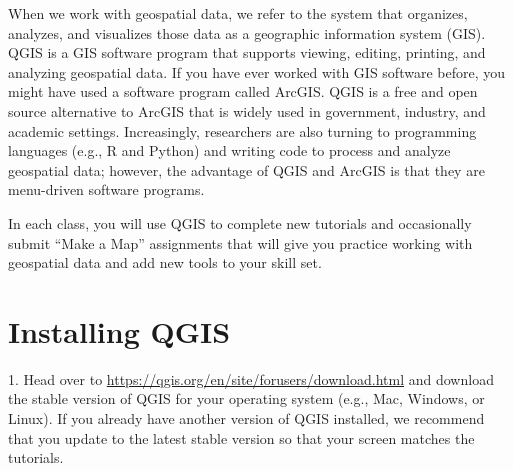 \documentclass[oneside,a4paper,11pt,explicit]{book}
\begin{document}
When we work with geospatial data, we refer to the system that organizes, analyzes, and visualizes those data as a geographic information system (GIS). QGIS is a GIS software program that supports viewing, editing, printing, and analyzing geospatial data.  If you have ever worked with GIS software before, you might have used a software program called ArcGIS. QGIS is a free and open source alternative to ArcGIS that is widely used in government, industry, and academic settings. Increasingly, researchers are also turning to programming languages (e.g., R and Python) and writing code to process and analyze geospatial data; however, the advantage of QGIS and ArcGIS is that they are menu-driven software programs. 

In each class, you will use QGIS to complete new tutorials and occasionally submit ``Make a Map'' assignments that will give you practice working with geospatial data and add new tools to your skill set. 

\section{Installing QGIS}


1. Head over to \href{https://qgis.org/en/site/forusers/download.html}{https://qgis.org/en/site/forusers/download.html} and download the stable version of QGIS for your operating system (e.g., Mac, Windows, or Linux). If you already have another version of QGIS installed, we recommend that you update to the latest stable version so that your screen matches the tutorials.
\end{document}
